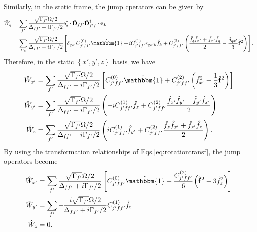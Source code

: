 \documentclass[pra,twocolumn,floatfix,superscriptaddress]{revtex4-1} %
\newcommand{\nn}{\nonumber}
\begin{document}
\begin{appendix}
Similarly, in the static frame, the jump operators can be given by
\begin{align}
\hat{W}_q &= \sum_{f'} \frac{\sqrt{\Gamma_{f'}}\Omega/2}{\Delta_{ff'}+i\Gamma_{f'}/2}\mathbf{e}_q^*\cdot \hat{\mathbf{D}}_{ff'} \hat{\mathbf{D}}_{f'f}^\dagger \cdot \mathbf{e}_L \nn \\
&= \sum_{f'k} \frac{\sqrt{\Gamma_{f'}}\Omega/2}{\Delta_{ff'}+i\Gamma_{f'}/2} \left[\delta_{qx'}C_{j'ff'}^{(0)}\hat{\mathbbm{1}} + iC_{j'ff'}^{(1)}\epsilon_{qx'k}\hat{f}_k + C_{j'ff'}^{(2)}\left(\frac{\hat{f}_q\hat{f}_{x'}+\hat{f}_{x'}\hat{f}_q }{2} - \frac{\delta_{qx'}}{3}\hat{\mathbf{f}}^2 \right) \right].
\end{align}
Therefore, in the static $ \left\{x',y',z \right\} $ basis, we have
\begin{align}
\hat{W}_{x'} &= \sum_{f'} \frac{\sqrt{\Gamma_{f'}}\Omega/2}{\Delta_{ff'}+i\Gamma_{f'}/2} \left[C_{j'ff'}^{(0)}\hat{\mathbbm{1}} + C_{j'ff'}^{(2)}\left(\hat{f}_{x'}^2-\frac{1}{3}\hat{\mathbf{f}}^2 \right) \right]\\
\hat{W}_{y'} &= \sum_{f'} \frac{\sqrt{\Gamma_{f'}}\Omega/2}{\Delta_{ff'}+i\Gamma_{f'}/2} \left(-iC_{j'ff'}^{(1)}\hat{f}_z + C_{j'ff'}^{(2)}\frac{\hat{f}_{x'}\hat{f}_{y'}+\hat{f}_{y'}\hat{f}_{x'}}{2} \right)\\
\hat{W}_{z} &= \sum_{f'} \frac{\sqrt{\Gamma_{f'}}\Omega/2}{\Delta_{ff'}+i\Gamma_{f'}/2} \left(iC_{j'ff'}^{(1)}\hat{f}_{y'} + C_{j'ff'}^{(2)}\frac{\hat{f}_z\hat{f}_{x'}+\hat{f}_{x'}\hat{f}_z}{2}  \right).
\end{align}
By using the transformation relationships of Eqs.\eqref{eq:rotationtransf}, the jump operators become 
\begin{subequations}\label{eq:rotationtransf_Wxyz}
\begin{align}
\hat{W}_{x'} &= \sum_{f'} \frac{\sqrt{\Gamma_{f'}}\Omega/2}{\Delta_{ff'}+i\Gamma_{f'}/2} \left[C_{j'ff'}^{(0)}\hat{\mathbbm{1}} + \frac{C_{j'ff'}^{(2)}}{6}\left(\hat{\mathbf{f}}^2-3\hat{f}_{z}^2 \right) \right]\\
\hat{W}_{y'} &= \sum_{f'} -\frac{i\sqrt{\Gamma_{f'}}\Omega/2}{\Delta_{ff'}+i\Gamma_{f'}/2} C_{j'ff'}^{(1)}\hat{f}_z  \\
\hat{W}_{z} &= 0.
\end{align}
\end{subequations}


\end{appendix}
\end{document}
